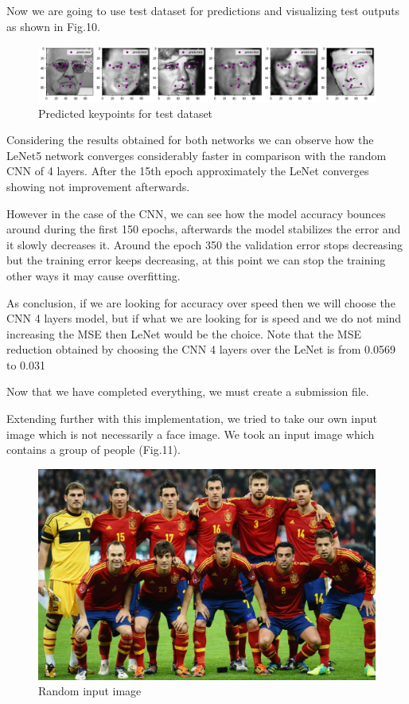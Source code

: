 \documentclass[conference]{IEEEtran}
\begin{document}
Now we are going to use test dataset for predictions and visualizing test outputs as shown in Fig.10.

\begin{figure}[h!]
    \centering
    \includegraphics[scale=0.2]{testPredicted.png}
    \caption{Predicted keypoints for test dataset}
    \label{fig:my_label}
\end{figure}

Considering the results obtained for both networks we can observe how the LeNet5  network converges considerably faster in comparison with the random CNN of 4 layers. After the 15th epoch approximately the LeNet converges showing not improvement afterwards.

However in the case of the CNN, we can see how the model accuracy bounces around during the first 150 epochs, afterwards the model stabilizes the error and it slowly decreases it. Around the epoch 350 the validation error stops decreasing but the training error keeps decreasing, at this point we can stop the training other ways it may cause overfitting.

As conclusion, if we are looking for accuracy over speed then we will choose the CNN 4 layers model, but if what we are looking for is speed and we do not mind increasing the MSE then LeNet would be the choice. Note that the MSE reduction obtained by choosing the CNN 4 layers over the LeNet is from 0.0569 to 0.031

Now that we have completed everything, we must create a submission file.

Extending further with this implementation, we tried to take our own input image which is not necessarily a face image. We took an input image which contains a group of people (Fig.11). 

\begin{figure}[h!]
    \centering
    \includegraphics[scale=0.08]{FootballPlayers.jpg}
    \caption{Random input image}
    \label{fig:my_label}
\end{figure}
\end{document}
